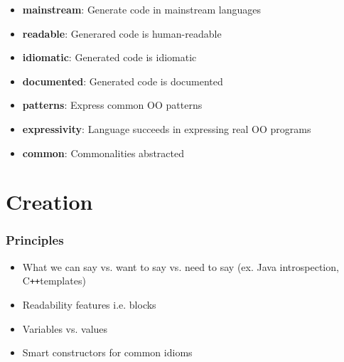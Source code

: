 \documentclass{beamer}
\newcommand{\authornote}[3]{\textcolor{#1}{[#3 ---#2]}}
\newcommand{\bmac}[1]{\authornote{red}{BM}{#1}}
\newcommand{\jc}[1]{\authornote{purple}{JC}{#1}}
\newcommand{\Cplusplus}{C\texttt{++}}
\begin{document}

\begin{frame}

\begin{itemize}
  \item \textbf{mainstream}: Generate code in mainstream languages
  \item \textbf{readable}: Generared code is human-readable
  \item \textbf{idiomatic}: Generated code is idiomatic
  \item \textbf{documented}: Generated code is documented
  \item \textbf{patterns}: Express common OO patterns
  \item \textbf{expressivity}: Language succeeds in expressing real OO 
  programs
  \item \textbf{common}: Commonalities abstracted
\end{itemize}



\end{frame}


\section[Creation]{Creation}


\begin{frame}

\frametitle{Principles}

\begin{itemize}
  \item What we can say vs. want to say vs. need to say (ex. Java 
  introspection, \Cplusplus templates)
  \item Readability features i.e. blocks
  \item Variables vs. values
  \item Smart constructors for common idioms
\end{itemize}

\end{frame}

\end{document}
